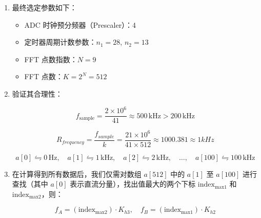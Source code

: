 \documentclass{article}
\begin{document}
\begin{enumerate}
\begin{equation}
f_{\text{sample}} = \frac{21 \times 10^6}{n_1 + n_2}
\end{equation}

\begin{equation}
\frac{21 \times 10^6}{n_1 + n_2} \geq 2 \times 100 \times 10^3
\end{equation}

\begin{equation}
R_{\text{frequency}} = \frac{f_{\text{sample}}}{2^N} = \frac{21 \times 10^6}{2^N (n_1 + n_2)} = 10^m
\end{equation}

\item 最终选定参数如下：

\begin{itemize}
  \item ADC 时钟预分频器（Prescaler）：4
  \item 定时器周期计数参数：$n_1 = 28$, $n_2 = 13$
  \item FFT 点数指数：$N = 9$
  \item FFT 点数：$K = 2^N = 512$
\end{itemize}

\item 验证其合理性：

\begin{equation}
f_{\text{sample}} = \frac{2 \times 10^6}{41} \approx 500 \, \text{kHz} > 200 \, \text{kHz}
\end{equation}

\begin{equation}
R_{frequency} = \frac{f_{sample}}{k} = \frac{21 \times 10^6}{41 \times 512} \approx 1000.381 \approx 1kHz
\end{equation}

\begin{equation}
a[0] \leftrightharpoons 0 \, \text{Hz}, \quad
a[1] \leftrightharpoons 1 \, \text{kHz}, \quad
a[2] \leftrightharpoons 2 \, \text{kHz}, \quad
\ldots, \quad
a[100] \leftrightharpoons 100 \, \text{kHz}
\end{equation}

\item 在计算得到所有数据后，我们仅需对数组 \( a[512] \) 中的 \( a[1] \) 至 \( a[100] \) 进行查找（其中 \( a[0] \) 表示直流分量），找出值最大的两个下标 \( \text{index}_{\text{max1}} \) 和 \( \text{index}_{\text{max2}} \)，则：

\begin{equation}
f_A = (\text{index}_{\text{max2}}) \cdot K_{h3}, \quad f_B = (\text{index}_{\text{max1}}) \cdot K_{h2}
\end{equation}

\end{enumerate}
\end{document}
